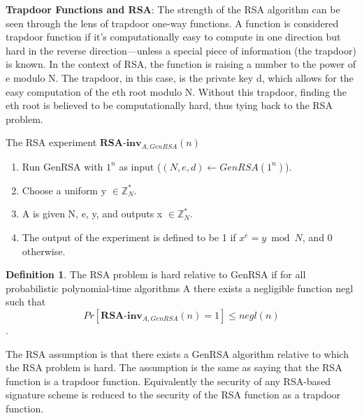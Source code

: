 \documentclass[]{final_report}
\theoremstyle{definition}
\newtheorem{definition}{Definition}[chapter]
\begin{document}
\textbf{Trapdoor Functions and RSA}: The strength of the RSA algorithm can be seen through the lens of trapdoor one-way functions. A function is considered trapdoor function if it's computationally easy to compute in one direction but hard in the reverse direction—unless a special piece of information (the trapdoor) is known. In the context of RSA, the function is raising a number to the power of e modulo N. The trapdoor, in this case, is the private key d, which allows for the easy computation of the eth root modulo N. Without this trapdoor, finding the eth root is believed to be computationally hard, thus tying back to the RSA problem. 

The RSA experiment $\textbf{RSA-inv}_{A,GenRSA}(n)$
\begin{enumerate}
    \item Run GenRSA with $1^n$ as input ($(N, e, d) \leftarrow GenRSA(1^n)$).
    \item Choose a uniform y $\in \mathbb{Z}^*_{N}$.
    \item A is given N, e, y, and outputs x $\in \mathbb{Z}^*_{N}$.
    \item The output of the experiment is defined to be 1 if $x^e = y \bmod N$, and 0 otherwise.
\end{enumerate}
\begin{definition} 
The RSA problem is hard relative to GenRSA if for all probabilistic polynomial-time algorithms A there exists a negligible function negl such that \[Pr[\textbf{RSA-inv}_{A,GenRSA}(n) = 1] \leq negl(n)\].
\end{definition}
The RSA assumption is that there exists a GenRSA algorithm relative to which the RSA problem is hard. The assumption is the same as saying that the RSA function is a trapdoor function. Equivalently the security of any RSA-based signature scheme is reduced to the security of the RSA function as a trapdoor function.
\end{document}
